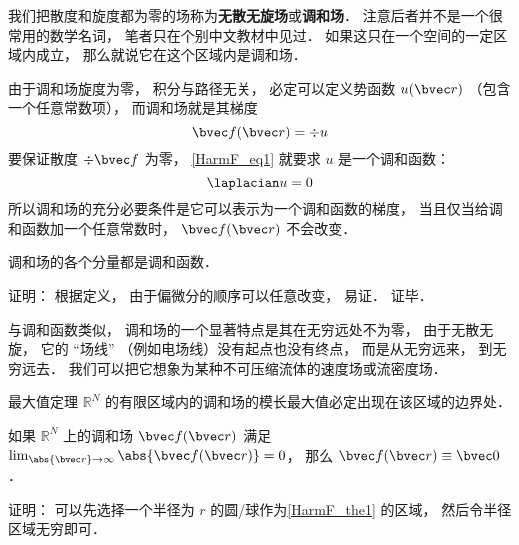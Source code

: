 
\begin{issues}
\issueDraft
\end{issues}


我们把散度和旋度都为零的场称为\textbf{无散无旋场}或\textbf{调和场}． 注意后者并不是一个很常用的数学名词， 笔者只在个别中文教材中见过． 如果这只在一个空间的一定区域内成立， 那么就说它在这个区域内是调和场．

由于调和场旋度为零， 积分与路径无关， 必定可以定义势函数 $u(\bvec r)$ （包含一个任意常数项）， 而调和场就是其梯度
\begin{equation}\label{HarmF_eq1}
\bvec f(\bvec r) = \div u
\end{equation}
要保证散度 $\div \bvec f$ 为零， \autoref{HarmF_eq1} 就要求 $u$ 是一个调和函数：
\begin{equation}
\laplacian u = 0
\end{equation}
所以调和场的充分必要条件是它可以表示为一个调和函数的梯度， 当且仅当给调和函数加一个任意常数时， $\bvec f(\bvec r)$ 不会改变．

\begin{theorem}{}
调和场的各个分量都是调和函数．
\end{theorem}
证明： 根据定义， 由于偏微分的顺序可以任意改变， 易证． 证毕．

与调和函数类似， 调和场的一个显著特点是其在无穷远处不为零， 由于无散无旋， 它的 “场线” （例如电场线）没有起点也没有终点， 而是从无穷远来， 到无穷远去． 我们可以把它想象为某种不可压缩流体的速度场或流密度场．

\begin{theorem}{最大值定理}\label{HarmF_the1}
$\mathbb R^N$ 的有限区域内的调和场的模长最大值必定出现在该区域的边界处．
\end{theorem}

\begin{corollary}{}
如果 $\mathbb R^N$ 上的调和场 $\bvec f(\bvec r)$ 满足 $\lim_{\abs{\bvec r}\to \infty} \abs{\bvec f(\bvec r)}  = 0$， 那么 $\bvec f(\bvec r) \equiv \bvec 0$．
\end{corollary}
证明： 可以先选择一个半径为 $r$ 的圆/球作为\autoref{HarmF_the1} 的区域， 然后令半径区域无穷即可．

